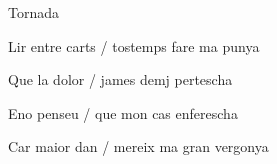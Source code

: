 \documentclass[12pt]{article}
\begin{document}
\begin{estrofaExtra}%




\begin{tornada}

Tornada

\end{tornada}


\end{estrofaExtra}


\begin{estrofa}

 Lir entre carts / tostemps fare ma punya

 Que la dolor / james demj pertescha

 Eno penseu / que mon cas enferescha

 Car maior dan / mereix ma gran vergonya

\end{estrofa}
\end{document}
